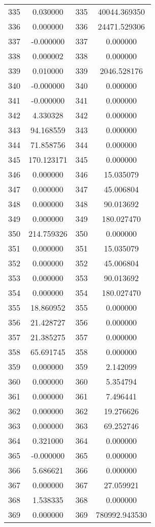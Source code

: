 \documentclass[12pt]{article}
\begin{document}
\begin{longtable}{@{}cccc@{}}
335 & 0.030000 & 335 & 40044.369350 \\
336 & 0.000000 & 336 & 24471.529306 \\
337 & -0.000000 & 337 & 0.000000 \\
338 & 0.000002 & 338 & 0.000000 \\
339 & 0.010000 & 339 & 2046.528176 \\
340 & -0.000000 & 340 & 0.000000 \\
341 & -0.000000 & 341 & 0.000000 \\
342 & 4.330328 & 342 & 0.000000 \\
343 & 94.168559 & 343 & 0.000000 \\
344 & 71.858756 & 344 & 0.000000 \\
345 & 170.123171 & 345 & 0.000000 \\
346 & 0.000000 & 346 & 15.035079 \\
347 & 0.000000 & 347 & 45.006804 \\
348 & 0.000000 & 348 & 90.013692 \\
349 & 0.000000 & 349 & 180.027470 \\
350 & 214.759326 & 350 & 0.000000 \\
351 & 0.000000 & 351 & 15.035079 \\
352 & 0.000000 & 352 & 45.006804 \\
353 & 0.000000 & 353 & 90.013692 \\
354 & 0.000000 & 354 & 180.027470 \\
355 & 18.860952 & 355 & 0.000000 \\
356 & 21.428727 & 356 & 0.000000 \\
357 & 21.385275 & 357 & 0.000000 \\
358 & 65.691745 & 358 & 0.000000 \\
359 & 0.000000 & 359 & 2.142099 \\
360 & 0.000000 & 360 & 5.354794 \\
361 & 0.000000 & 361 & 7.496441 \\
362 & 0.000000 & 362 & 19.276626 \\
363 & 0.000000 & 363 & 69.252746 \\
364 & 0.321000 & 364 & 0.000000 \\
365 & -0.000000 & 365 & 0.000000 \\
366 & 5.686621 & 366 & 0.000000 \\
367 & 0.000000 & 367 & 27.059921 \\
368 & 1.538335 & 368 & 0.000000 \\
369 & 0.000000 & 369 & 780992.943530 \\

\end{longtable}
\end{document}
